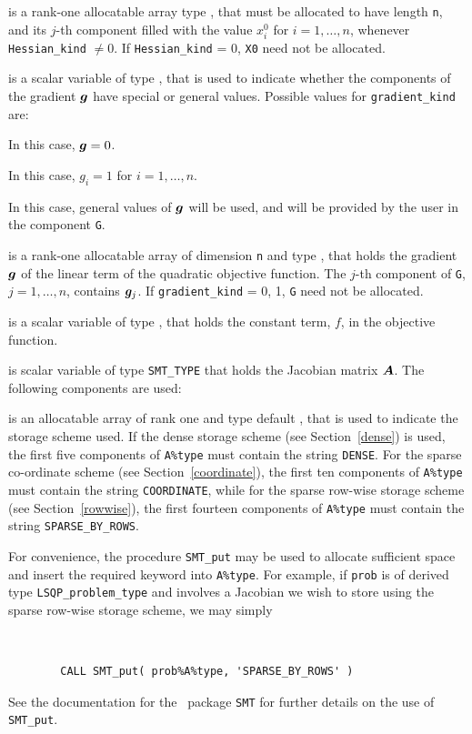 \documentclass{galahad}
\newcommand{\packagename}{LSQP}
\begin{document}
\begin{description}
 is a rank-one allocatable array type \realdp, that 
must be allocated to have length {\tt n}, and its $j$-th component 
filled with the value $x^0_{i}$ for $i = 1, \ldots ,n$, 
whenever {\tt Hessian\_kind} $\neq 0$.
If {\tt Hessian\_kind} {= 0}, {\tt X0} need not be allocated.

 is a scalar variable of type \integer, 
that is used to indicate whether the components of the gradient ${\bm{g}}$ 
have special or general values. Possible values for {\tt gradient\_kind} are:
\begin{description}
  In this case, ${\bm{g}} = 0$.

 In this case, $g_{i} = 1$ for $i = 1, \ldots ,n$.

 In this case, general values of ${\bm{g}}$ will be used,
     and will be provided by the user in the component {\tt G}.
\end{description}

 is a rank-one allocatable array of dimension {\tt n} and type 
\realdp, that holds the gradient ${\bm{g}}$ 
of the linear term of the quadratic objective function.
The $j$-th component of 
{\tt G}, $j = 1,  \ldots ,  n$, contains ${\bm{g}}_{j}$.
If {\tt gradient\_kind} {= 0, 1}, {\tt G} need not be allocated.

 is a scalar variable of type 
\realdp, that holds 
the constant term, $f$, in the objective function.

 is scalar variable of type {\tt SMT\_TYPE} 
that holds the Jacobian matrix ${\bm{A}}$. The following components are used:

\begin{description}

 is an allocatable array of rank one and type default \character, that
is used to indicate the storage scheme used. If the dense storage scheme 
(see Section~\ref{dense}) is used, 
the first five components of {\tt A\%type} must contain the
string {\tt DENSE}.
For the sparse co-ordinate scheme (see Section~\ref{coordinate}), 
the first ten components of {\tt A\%type} must contain the
string {\tt COORDINATE}, while 
for the sparse row-wise storage scheme (see Section~\ref{rowwise}),
the first fourteen components of {\tt A\%type} must contain the
string {\tt SPARSE\_BY\_ROWS}.

For convenience, the procedure {\tt SMT\_put} 
may be used to allocate sufficient space and insert the required keyword
into {\tt A\%type}.
For example, if {\tt prob} is of derived type {\tt \packagename\_problem\_type}
and involves a Jacobian we wish to store using the sparse row-wise 
storage scheme, we may simply
{\tt 
\begin{verbatim}
        CALL SMT_put( prob%A%type, 'SPARSE_BY_ROWS' )
\end{verbatim}
}
\noindent
See the documentation for the \galahad\ package {\tt SMT} 
for further details on the use of {\tt SMT\_put}.


\end{description}
\end{description}
\end{document}
